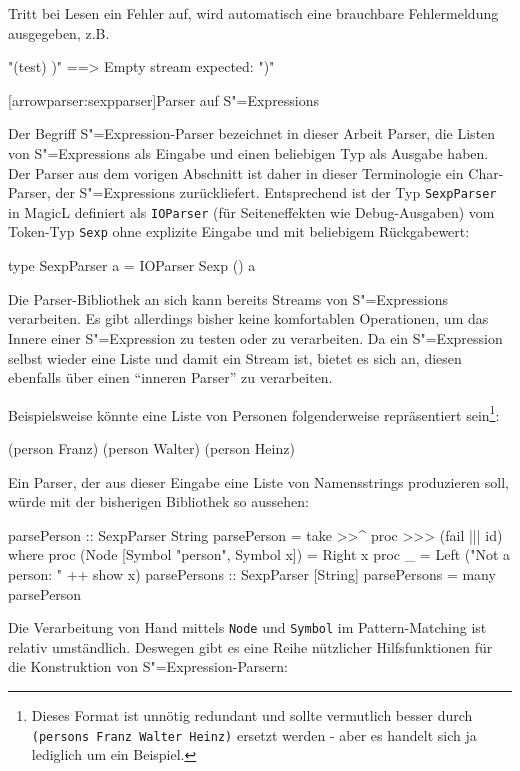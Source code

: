 \documentclass[11pt, a4paper, bibgerm]{scrbook}
\newcommand\icode[1]{\lstinline?#1?}
\newcommand\lsection{}
\newcommand{\sexp}{S"=Expression}
\newcommand{\sexps}{S"=Expressions}
\begin{document}
Tritt bei Lesen ein Fehler auf, wird automatisch eine brauchbare Fehlermeldung
ausgegeben, z.B.

\begin{code}
"(test) )"  ==>  Empty stream expected: ")"
\end{code}

\lsection[arrowparser:sexpparser]{Parser auf \sexps}

Der Begriff \sexp{}-Parser bezeichnet in dieser Arbeit Parser, die
Listen von \sexps{} als Eingabe und einen beliebigen Typ als Ausgabe
haben. Der Parser aus dem vorigen Abschnitt ist daher in dieser
Terminologie ein Char-Parser, der \sexps{} zurückliefert. Entsprechend
ist der Typ \icode{SexpParser} in MagicL definiert als \icode{IOParser} (für
Seiteneffekten wie Debug-Ausgaben) vom Token-Typ \icode{Sexp} ohne
explizite Eingabe und mit beliebigem Rückgabewert:
\begin{code}
type SexpParser a = IOParser Sexp () a  
\end{code}
Die Parser-Bibliothek an sich kann bereits Streams von \sexps{}
verarbeiten. Es gibt allerdings bisher keine komfortablen Operationen,
um das Innere einer \sexp{} zu testen oder zu verarbeiten. Da ein
\sexp{} selbst wieder eine Liste und damit ein Stream ist, bietet es
sich an, diesen ebenfalls über einen "`inneren Parser"' zu verarbeiten.

Beispielsweise könnte eine Liste von Personen folgenderweise
repräsentiert sein\footnote{Dieses Format ist unnötig redundant und
  sollte vermutlich besser durch \icode{(persons Franz Walter Heinz)}
  ersetzt werden - aber es handelt sich ja lediglich um ein Beispiel.}:
\begin{code}
(person Franz)
(person Walter)
(person Heinz)
\end{code}

Ein Parser, der aus dieser Eingabe eine Liste von Namensstrings
produzieren soll, würde mit der bisherigen Bibliothek so aussehen:

\begin{code}
parsePerson :: SexpParser String
parsePerson = take >>^ proc >>> (fail ||| id)
  where proc (Node [Symbol "person", Symbol x]) = Right x
        proc _ = Left ("Not a person: " ++ show x)
parsePersons :: SexpParser [String]
parsePersons = many parsePerson
\end{code} %

Die Verarbeitung von Hand mittels \icode{Node} und \icode{Symbol} im
Pattern-Matching ist relativ umständlich. Deswegen gibt es eine Reihe
nützlicher Hilfsfunktionen für die Konstruktion von \sexp{}-Parsern:
\end{document}
